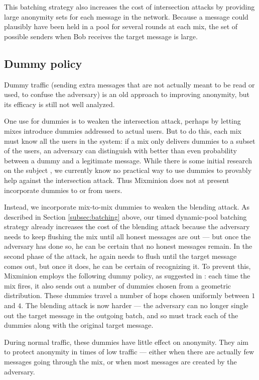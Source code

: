 \documentclass[final,inpress,inline]{ieee}
\begin{document}
This batching strategy also increases the cost of intersection attacks by
providing large anonymity sets for each message in the network. Because
a message could plausibly have been held in a pool for several rounds
at each mix, the set of possible senders when Bob receives the target
message is large.

\subsection{Dummy policy}

Dummy traffic (sending extra messages that are not actually meant to
be read or used, to confuse the adversary) is an old approach to
improving anonymity, but its efficacy is still not well analyzed.

One use for dummies is to weaken the intersection attack, perhaps by letting
mixes introduce dummies addressed to actual users. But to do this, each mix
must know all the users in the system: if a mix only delivers dummies to a
subset of the users, an adversary can distinguish with better than even
probability between a dummy and a legitimate message. While there is some
initial research on the subject \cite{langos02}, we currently know no
practical way to use dummies to provably help against the intersection
attack. Thus Mixminion does not at present incorporate dummies to or from
users.

Instead, we incorporate mix-to-mix dummies to weaken the blending attack.  As
described in
Section \ref{subsec:batching} above, our timed
dynamic-pool batching strategy already increases the cost of the blending attack
because the adversary needs to keep flushing the mix until all honest
messages are out --- but once the adversary has done so, he can be certain that no
honest messages remain. In the second phase of the attack, he again
needs to flush until the target message comes out, but once it does, he
can be certain of recognizing it. To prevent this, Mixminion employs the following
dummy policy, as suggested in \cite{batching-taxonomy}:
each time the mix
fires, it also sends out a number of dummies chosen from a geometric
distribution. These dummies travel a number of hops chosen uniformly
between $1$ and $4$. The blending attack is now harder --- the adversary
can no longer single out the target message in the outgoing batch, and so
must track each of the dummies along with the original target message.

During normal traffic, these dummies have little effect on anonymity. They
aim to protect anonymity in times of low traffic --- either when there are
actually few messages going through the mix, or when most messages are
created by the adversary.
\end{document}
